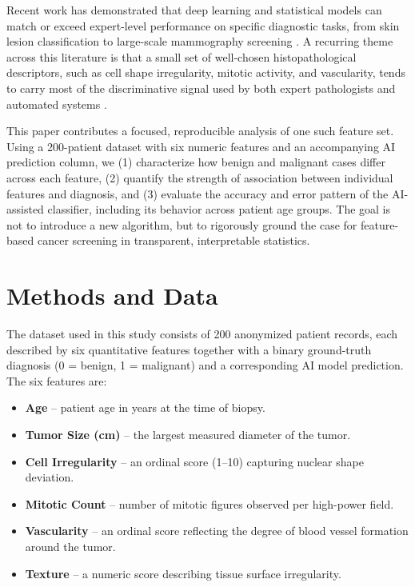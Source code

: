 \documentclass[10pt,twocolumn]{article}
\begin{document}
Recent work has demonstrated that deep learning and statistical models can match or exceed expert-level performance on specific diagnostic tasks, from skin lesion classification \cite{esteva2017dermatologist} to large-scale mammography screening \cite{mckinney2020international}. A recurring theme across this literature is that a small set of well-chosen histopathological descriptors, such as cell shape irregularity, mitotic activity, and vascularity, tends to carry most of the discriminative signal used by both expert pathologists and automated systems \cite{litjens2017survey}.

This paper contributes a focused, reproducible analysis of one such feature set. Using a 200-patient dataset with six numeric features and an accompanying AI prediction column, we (1) characterize how benign and malignant cases differ across each feature, (2) quantify the strength of association between individual features and diagnosis, and (3) evaluate the accuracy and error pattern of the AI-assisted classifier, including its behavior across patient age groups. The goal is not to introduce a new algorithm, but to rigorously ground the case for feature-based cancer screening in transparent, interpretable statistics.

\section{Methods and Data}
The dataset used in this study consists of 200 anonymized patient records, each described by six quantitative features together with a binary ground-truth diagnosis (0 = benign, 1 = malignant) and a corresponding AI model prediction. The six features are:

\begin{itemize}[leftmargin=*,itemsep=1pt,topsep=2pt]
  \item \textbf{Age} -- patient age in years at the time of biopsy.
  \item \textbf{Tumor Size (cm)} -- the largest measured diameter of the tumor.
  \item \textbf{Cell Irregularity} -- an ordinal score (1--10) capturing nuclear shape deviation.
  \item \textbf{Mitotic Count} -- number of mitotic figures observed per high-power field.
  \item \textbf{Vascularity} -- an ordinal score reflecting the degree of blood vessel formation around the tumor.
  \item \textbf{Texture} -- a numeric score describing tissue surface irregularity.
\end{itemize}
\end{document}
